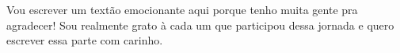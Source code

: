 
Vou escrever um textão emocionante aqui porque tenho muita gente pra agradecer! Sou realmente grato à cada um que participou dessa jornada e quero escrever essa parte com carinho.












